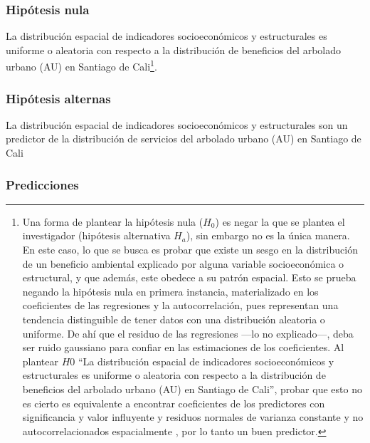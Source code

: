 \documentclass[12pt,a4paper,openany]{book}
\let\rmarkdownfootnote\footnote%
\def\footnote{\protect\rmarkdownfootnote}
\theoremstyle{definition}
\theoremstyle{definition}
\theoremstyle{definition}
\theoremstyle{remark}
\begin{document}
\subsubsection{Hipótesis nula}\label{hipuxf3tesis-nula}

La distribución espacial de indicadores socioeconómicos y estructurales
es uniforme o aleatoria con respecto a la distribución de beneficios del
arbolado urbano (AU) en Santiago de Cali\footnote{Una forma de plantear
  la hipótesis nula (\(H_0\)) es negar la que se plantea el investigador
  (hipótesis alternativa \(H_a\)), sin embargo no es la única manera. En
  este caso, lo que se busca es probar que existe un sesgo en la
  distribución de un beneficio ambiental explicado por alguna variable
  socioeconómica o estructural, y que además, este obedece a su patrón
  espacial. Esto se prueba negando la hipótesis nula en primera
  instancia, materializado en los coeficientes de las regresiones y la
  autocorrelación, pues representan una tendencia distinguible de tener
  datos con una distribución aleatoria o uniforme. De ahí que el residuo
  de las regresiones ---lo no explicado---, deba ser ruido gaussiano
  para confiar en las estimaciones de los coeficientes. Al plantear
  \(H0\) ``La distribución espacial de indicadores socioeconómicos y
  estructurales es uniforme o aleatoria con respecto a la distribución
  de beneficios del arbolado urbano (AU) en Santiago de Cali'', probar
  que esto no es cierto es equivalente a encontrar coeficientes de los
  predictores con significancia y valor influyente y residuos normales
  de varianza constante y no autocorrelacionados espacialmente , por lo
  tanto un buen predictor.}.

\subsubsection{Hipótesis alternas}\label{hipuxf3tesis-alternas}

La distribución espacial de indicadores socioeconómicos y estructurales
son un predictor de la distribución de servicios del arbolado urbano
(AU) en Santiago de Cali

\subsubsection{Predicciones}\label{predicciones}
\end{document}
